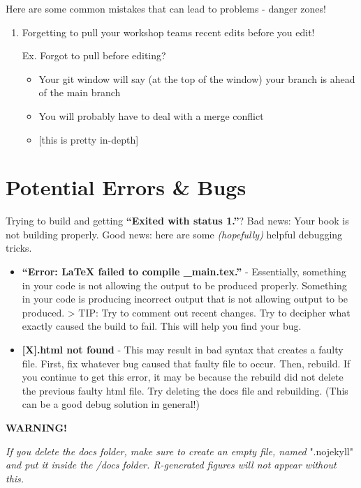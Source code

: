 \documentclass[
]{book}
\providecommand{\tightlist}{%
  \setlength{\itemsep}{0pt}\setlength{\parskip}{0pt}}
\newenvironment{redbox}{
  \definecolor{shadecolor}{RGB}{243, 154, 157}
  \color{white}
  \begin{shaded}}
 {\end{shaded}}
\theoremstyle{definition}
\theoremstyle{definition}
\theoremstyle{definition}
\theoremstyle{definition}
\theoremstyle{remark}
\begin{document}
Here are some common mistakes that can lead to problems - danger zones!

\begin{enumerate}
\def\labelenumi{\arabic{enumi}.}
\item
  Forgetting to pull your workshop teams recent edits before you edit!

  Ex. Forgot to pull before editing?

  \begin{itemize}
  \tightlist
  \item
    Your git window will say (at the top of the window) your branch is ahead of the main branch
  \item
    You will probably have to deal with a merge conflict
  \item
    {[}this is pretty in-depth{]}
  \end{itemize}
\end{enumerate}

\section{Potential Errors \& Bugs}\label{potential-errors-bugs}

Trying to build and getting \textbf{``Exited with status 1.''}? Bad news: Your book is not building properly. Good news: here are some \emph{(hopefully)} helpful debugging tricks.

\begin{itemize}
\item
  \textbf{``Error: LaTeX failed to compile \_main.tex.''} - Essentially, something in your code is not allowing the output to be produced properly. Something in your code is producing incorrect output that is not allowing output to be produced.
  \textgreater{} TIP: Try to comment out recent changes. Try to decipher what exactly caused the build to fail. This will help you find your bug.
\item
  \textbf{{[}X{]}.html not found} - This may result in bad syntax that creates a faulty file. First, fix whatever bug caused that faulty file to occur. Then, rebuild. If you continue to get this error, it may be because the rebuild did not delete the previous faulty html file. Try deleting the docs file and rebuilding. (This can be a good debug solution in general!)
\end{itemize}

\begin{redbox}

\begin{center}
\textbf{WARNING!}

\end{center}

\emph{If you delete the docs folder, make sure to create an empty file, named }".nojekyll" \emph{and put it inside the /docs folder. R-generated figures will not appear without this.}

\end{redbox}
\end{document}
